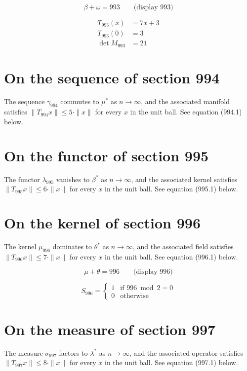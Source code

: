 \documentclass{article}
\begin{document}
$$
\beta + \omega = 993 \qquad \text{(display 993)}
$$

\begin{align}
T_{993}(x) &= 7 x + 3 \\
T_{993}(0) &= 3 \\
\det M_{993} &= 21
\end{align}

\section{On the sequence of section 994}
The sequence $\gamma_{994}$ commutes to $\mu^{*}$ as $n \to \infty$,
and the associated manifold satisfies $\|T_{994} x\| \leq 5 \cdot \|x\|$
for every $x$ in the unit ball. See equation (994.1) below.

\section{On the functor of section 995}
The functor $\lambda_{995}$ vanishes to $\beta^{*}$ as $n \to \infty$,
and the associated kernel satisfies $\|T_{995} x\| \leq 6 \cdot \|x\|$
for every $x$ in the unit ball. See equation (995.1) below.

\section{On the kernel of section 996}
The kernel $\mu_{996}$ dominates to $\theta^{*}$ as $n \to \infty$,
and the associated field satisfies $\|T_{996} x\| \leq 7 \cdot \|x\|$
for every $x$ in the unit ball. See equation (996.1) below.

$$
\mu + \theta = 996 \qquad \text{(display 996)}
$$

\begin{equation}
S_{996} = \begin{cases} 1 & \text{if } 996 \bmod 2 = 0 \\ 0 & \text{otherwise} \end{cases}
\end{equation}

\section{On the measure of section 997}
The measure $\sigma_{997}$ factors to $\lambda^{*}$ as $n \to \infty$,
and the associated operator satisfies $\|T_{997} x\| \leq 8 \cdot \|x\|$
for every $x$ in the unit ball. See equation (997.1) below.
\end{document}
